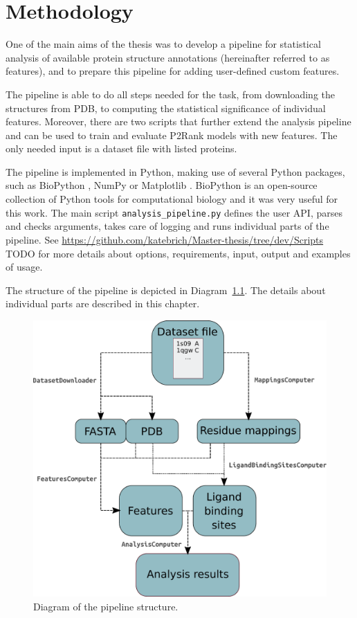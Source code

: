 
\chapter{Methodology}

One of the main aims of the thesis was to develop a pipeline for statistical analysis of available protein structure annotations (hereinafter referred to as features), and to prepare this pipeline for adding user-defined custom features.

The pipeline is able to do all steps needed for the task, from downloading the structures from PDB, to computing the statistical significance of individual features. Moreover, there are two scripts that further extend the analysis pipeline and can be used to train and evaluate P2Rank models with new features. The only needed input is a dataset file with listed proteins.

The pipeline is implemented in Python, making use of several Python packages, such as BioPython \cite{biopython}, NumPy \cite{numpy} or Matplotlib \cite{maplotlib}. BioPython is an open-source collection of Python tools for computational biology and it was very useful for this work. The main script \texttt{analysis\_pipeline.py} defines the user API, parses and checks arguments, takes care of logging and runs individual parts of the pipeline. See \url{ https://github.com/katebrich/Master-thesis/tree/dev/Scripts} TODO for more details about options, requirements, input, output and examples of usage.

The structure of the pipeline is depicted in Diagram~\ref{fig:diagram}. The details about individual parts are described in this chapter.

\begin{figure}[!htbp]\centering
\includegraphics[width=120mm]{../img/pipelineDiagram.pdf}
\caption{Diagram of the pipeline structure.}
\label{fig:diagram}
\end{figure}


